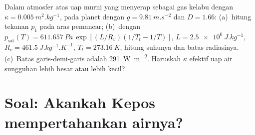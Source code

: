 \begin{exercise}[$\star\star\star$]\label{exo:b3:planetary-atmospheres:12}
Dalam atmosfer atas uap murni yang menyerap sebagai gas kelabu dengan $\kappa =
\qty{0.005}{m^2.kg^{-1}}$, pada planet dengan $g = \qty{9.81}{m.s^{-2}}$
dan $D = 1.66$: (a)~hitung tekanan $p_1$ pada aras pemancar;
(b)~dengan $p_\mathrm{sat}(T) = \qty{611.657}{Pa}\,\exp[(L/R_v)(1/T_t -
1/T)]$, $L = \qty{2.5e6}{J.kg^{-1}}$, $R_v = \qty{461.5}{J.kg^{-1}.K^{-1}}$,
$T_t = \qty{273.16}{K}$, hitung suhunya dan batas radiasinya.
(c)~Batas garis-demi-garis adalah \qty{291}{W.m^{-2}}. Haruskah
$\kappa$ efektif uap air sungguhan lebih besar atau lebih kecil?
\end{exercise}

\section{Soal: Akankah Kepos mempertahankan airnya?}

